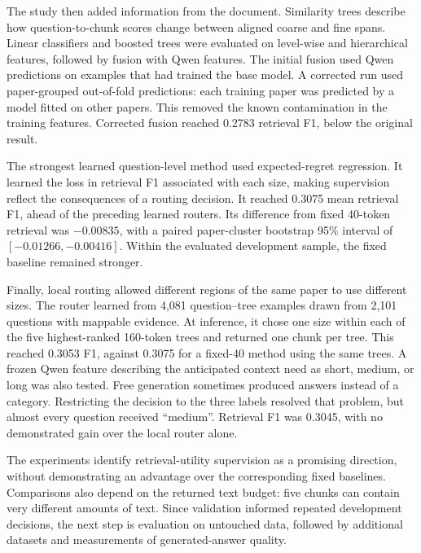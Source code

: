 The study then added information from the document. Similarity trees
describe how question-to-chunk scores change between aligned coarse and
fine spans. Linear classifiers and boosted trees were evaluated on
level-wise and hierarchical features, followed by fusion with Qwen
features. The initial fusion used Qwen predictions on examples that had
trained the base model. A corrected run used paper-grouped out-of-fold
predictions: each training paper was predicted by a model fitted on other
papers. This removed the known contamination in the training features.
Corrected fusion reached 0.2783 retrieval F1, below the original result.

The strongest learned question-level method used expected-regret
regression. It learned the loss in retrieval F1 associated with each
size, making supervision reflect the consequences of a routing decision.
It reached 0.3075 mean retrieval F1, ahead of the preceding learned
routers. Its difference from fixed
40-token retrieval was $-0.00835$, with a paired paper-cluster bootstrap
95\% interval of $[-0.01266,-0.00416]$. Within the evaluated development
sample, the fixed baseline remained stronger.

Finally, local routing allowed different regions of the same paper to use
different sizes. The router learned from 4,081 question--tree examples
drawn from 2,101 questions with mappable evidence. At inference, it chose one
size within each of the five highest-ranked 160-token trees and returned
one chunk per tree.
This reached 0.3053 F1, against 0.3075 for a fixed-40 method using the same
trees. A frozen Qwen feature describing the anticipated context need as
short, medium, or long was also tested. Free generation sometimes
produced answers instead of a category. Restricting the decision to
the three labels resolved that problem, but almost every question
received \enquote{medium}. Retrieval
F1 was 0.3045, with no demonstrated gain over the local router alone.

The experiments identify retrieval-utility supervision as a promising
direction, without demonstrating an advantage over the corresponding
fixed baselines. Comparisons also depend on the returned text budget:
five chunks can contain very different amounts of text. Since validation
informed repeated development decisions, the next step is evaluation on
untouched data, followed by additional datasets and measurements of
generated-answer quality.
